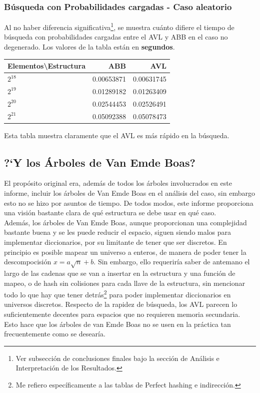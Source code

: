 \documentclass[12pt,letterpaper]{report}
\begin{document}
\subsubsection{Búsqueda con Probabilidades cargadas - Caso aleatorio}
Al no haber diferencia significativa\footnote{Ver subsección de conclusiones finales bajo la sección de Análisis e Interpretación de los Resultados.}, se muestra cuánto difiere el tiempo de búsqueda con probabilidades cargadas entre el AVL y ABB en el caso no degenerado. Los valores de la tabla están en \textbf{segundos}.

\begin{center}
  \begin{tabular}{|l|r|r|}
    \hline
    Elementos\textbackslash Estructura & ABB & AVL \\ \hline
    $2^{18}$ & 0.00653871 & 0.00631745  \\ \hline
    $2^{19}$ & 0.01289182 & 0.01263409  \\ \hline
    $2^{20}$ & 0.02544453 & 0.02526491  \\ \hline
    $2^{21}$ & 0.05092388 & 0.05078473 \\ \hline
  \end{tabular}
\end{center}

Esta tabla muestra claramente que el AVL es más rápido en la búsqueda.

\subsection{?`Y los Árboles de Van Emde Boas?}
\label{subsec:vanemdeboas}

El propósito original era, además de todos los árboles involucrados en este informe, incluir los árboles de Van Emde Boas en el análisis del caso, sin embargo esto no se hizo por asuntos de tiempo. De todos modos, este informe proporciona una visión bastante clara de qué estructura se debe usar en qué caso.\\

Además, los árboles de Van Emde Boas, aunque proporcionan una complejidad bastante buena y se les puede reducir el espacio, siguen siendo malos para implementar diccionarios, por su limitante de tener que ser discretos. En principio es posible mapear un universo a enteros, de manera de poder tener la descompocisión $x = a\sqrt{n} + b$. Sin embargo, ello requeriría saber de antemano el largo de las cadenas que se van a insertar en la estructura y una función de mapeo, o de hash sin colisiones para cada llave de la estructura, sin mencionar todo lo que hay que tener detrás\footnote{Me refiero específicamente a las tablas de Perfect hashing e indirección.} para poder implementar diccionarios en universos discretos. Respecto de la rapidez de búsqueda, los AVL parecen lo suficientemente decentes para espacios que no requieren memoria secundaria. Esto hace que los árboles de van Emde Boas no se usen en la práctica tan frecuentemente como se desearía.
\end{document}
